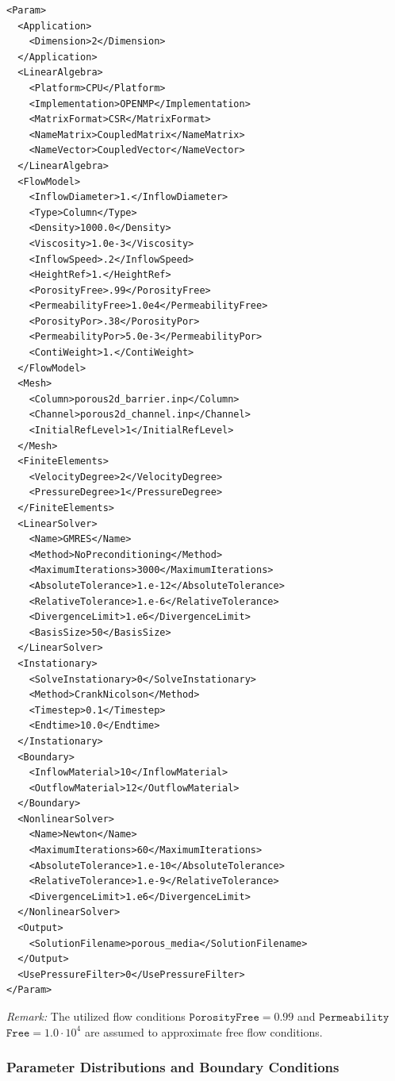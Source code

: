 \documentclass{article}
\begin{document}
\begin{lstlisting}
<Param>
  <Application>
    <Dimension>2</Dimension>
  </Application>
  <LinearAlgebra>
    <Platform>CPU</Platform>
    <Implementation>OPENMP</Implementation>
    <MatrixFormat>CSR</MatrixFormat>
    <NameMatrix>CoupledMatrix</NameMatrix>
    <NameVector>CoupledVector</NameVector>
  </LinearAlgebra>
  <FlowModel>
    <InflowDiameter>1.</InflowDiameter>
    <Type>Column</Type>
    <Density>1000.0</Density>
    <Viscosity>1.0e-3</Viscosity>
    <InflowSpeed>.2</InflowSpeed>
    <HeightRef>1.</HeightRef>
    <PorosityFree>.99</PorosityFree>
    <PermeabilityFree>1.0e4</PermeabilityFree>
    <PorosityPor>.38</PorosityPor>
    <PermeabilityPor>5.0e-3</PermeabilityPor>
    <ContiWeight>1.</ContiWeight>
  </FlowModel>
  <Mesh>
    <Column>porous2d_barrier.inp</Column>
    <Channel>porous2d_channel.inp</Channel>
    <InitialRefLevel>1</InitialRefLevel>
  </Mesh>
  <FiniteElements>
    <VelocityDegree>2</VelocityDegree>
    <PressureDegree>1</PressureDegree>
  </FiniteElements>
  <LinearSolver>
    <Name>GMRES</Name>
    <Method>NoPreconditioning</Method>
    <MaximumIterations>3000</MaximumIterations>
    <AbsoluteTolerance>1.e-12</AbsoluteTolerance>
    <RelativeTolerance>1.e-6</RelativeTolerance>
    <DivergenceLimit>1.e6</DivergenceLimit>
    <BasisSize>50</BasisSize>
  </LinearSolver>
  <Instationary>
    <SolveInstationary>0</SolveInstationary>
    <Method>CrankNicolson</Method>
    <Timestep>0.1</Timestep>
    <Endtime>10.0</Endtime>
  </Instationary>
  <Boundary>
    <InflowMaterial>10</InflowMaterial>
    <OutflowMaterial>12</OutflowMaterial>
  </Boundary>
  <NonlinearSolver>
    <Name>Newton</Name>
    <MaximumIterations>60</MaximumIterations>
    <AbsoluteTolerance>1.e-10</AbsoluteTolerance>
    <RelativeTolerance>1.e-9</RelativeTolerance>
    <DivergenceLimit>1.e6</DivergenceLimit>
  </NonlinearSolver>
  <Output>
    <SolutionFilename>porous_media</SolutionFilename>
  </Output>
  <UsePressureFilter>0</UsePressureFilter>
</Param>
\end{lstlisting}
\vspace{15pt}
\emph{Remark:}
The utilized flow conditions $\texttt{PorosityFree}=0.99$ and $\texttt{Permeability}$ $\texttt{Free} =1.0\cdot10^4$ are assumed to approximate free flow conditions.

\subsubsection{Parameter Distributions and Boundary Conditions}
\label{sec:example:subsec:parameterdistribution}
\end{document}

